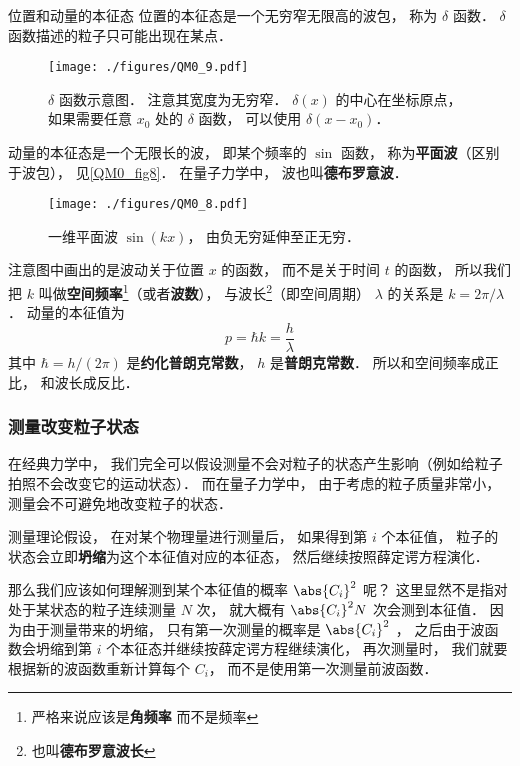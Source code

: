 \begin{example}{位置和动量的本征态}
位置的本征态是一个无穷窄无限高的波包， 称为 $\delta$ 函数． $\delta$ 函数描述的粒子只可能出现在某点． 
\begin{figure}[ht]
\centering
\texttt{[image: ./figures/QM0\_9.pdf]}
\caption{$\delta$ 函数示意图． 注意其宽度为无穷窄． $\delta(x)$ 的中心在坐标原点， 如果需要任意 $x_0$ 处的 $\delta$ 函数， 可以使用 $\delta(x - x_0)$．} \label{QM0_fig9} %
\end{figure}

动量的本征态是一个无限长的波， 即某个频率的 $\sin$ 函数， 称为\textbf{平面波}（区别于波包）， 见\autoref{QM0_fig8}． 在量子力学中， 波也叫\textbf{德布罗意波}．

\begin{figure}[ht]
\centering
\texttt{[image: ./figures/QM0\_8.pdf]}
\caption{一维平面波 $\sin(kx)$， 由负无穷延伸至正无穷．} \label{QM0_fig8}
\end{figure}

注意图中画出的是波动关于位置 $x$ 的函数， 而不是关于时间 $t$ 的函数， 所以我们把 $k$ 叫做\textbf{空间频率}\footnote{严格来说应该是\textbf{角频率} 而不是频率}（或者\textbf{波数}）， %
与波长\footnote{也叫\textbf{德布罗意波长}}（即空间周期） $\lambda$ 的关系是 $k = 2\pi/\lambda$． 动量的本征值为
\begin{equation}\label{QM0_eq1}
p = \hbar k = \frac{h}{\lambda}
\end{equation}
其中 $\hbar = h / (2\pi)$ 是\textbf{约化普朗克常数}， $h$ 是\textbf{普朗克常数}． 所以和空间频率成正比， 和波长成反比．
\end{example}

\subsubsection{测量改变粒子状态}
在经典力学中， 我们完全可以假设测量不会对粒子的状态产生影响（例如给粒子拍照不会改变它的运动状态）． 而在量子力学中， 由于考虑的粒子质量非常小， 测量会不可避免地改变粒子的状态．

测量理论假设， 在对某个物理量进行测量后， 如果得到第 $i$ 个本征值， 粒子的状态会立即\textbf{坍缩}为这个本征值对应的本征态， 然后继续按照薛定谔方程演化．

那么我们应该如何理解测到某个本征值的概率 $\abs{C_i}^2$ 呢？ 这里显然不是指对处于某状态的粒子连续测量 $N$ 次， 就大概有 $\abs{C_i}^2 N$ 次会测到本征值． 因为由于测量带来的坍缩， 只有第一次测量的概率是 $\abs{C_i}^2$ ， 之后由于波函数会坍缩到第 $i$ 个本征态并继续按薛定谔方程继续演化， 再次测量时， 我们就要根据新的波函数重新计算每个 $C_i$， 而不是使用第一次测量前波函数．

